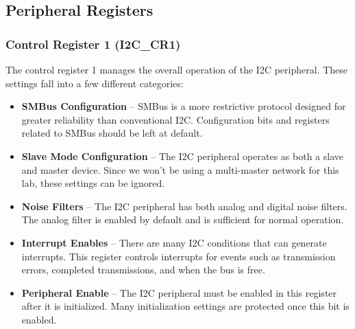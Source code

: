 \documentclass[11pt,fleqn]{book} %
\begin{document}
\subsection{Peripheral Registers}
    \subsubsection{Control Register 1 (I2C\_CR1)}
    The control register 1 manages the overall operation of the I2C peripheral. These settings fall into a few different categories:
    \begin{itemize}
        \item \textbf{SMBus Configuration} -- SMBus is a more restrictive protocol designed for greater reliability than conventional I2C. Configuration bits and registers related to SMBus should be left at default. 
        \item \textbf{Slave Mode Configuration} -- The I2C peripheral operates as both a slave and master device. Since we won't be using a multi-master network for this lab, these settings can be ignored. 
        \item \textbf{Noise Filters} -- The I2C peripheral has both analog and digital noise filters. The analog filter is enabled by default and is sufficient for normal operation. 
        \item \textbf{Interrupt Enables} -- There are many I2C conditions that can generate interrupts. This register controls interrupts for events such as transmission errors, completed transmissions, and when the bus is free. 
        \item \textbf{Peripheral Enable} -- The I2C peripheral must be enabled in this register after it is initialized. Many initialization settings are protected once this bit is enabled.
    \end{itemize}  
    
\end{document}
